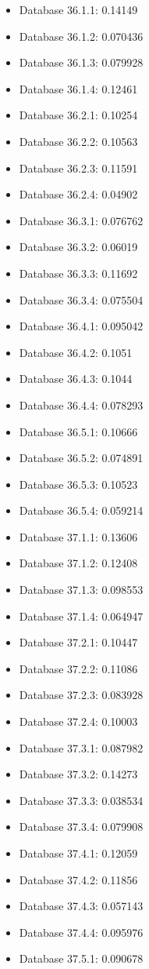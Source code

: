 \begin{itemize}
\item Database 36.1.1: 0.14149
\item Database 36.1.2: 0.070436
\item Database 36.1.3: 0.079928
\item Database 36.1.4: 0.12461
\item Database 36.2.1: 0.10254
\item Database 36.2.2: 0.10563
\item Database 36.2.3: 0.11591
\item Database 36.2.4: 0.04902
\item Database 36.3.1: 0.076762
\item Database 36.3.2: 0.06019
\item Database 36.3.3: 0.11692
\item Database 36.3.4: 0.075504
\item Database 36.4.1: 0.095042
\item Database 36.4.2: 0.1051
\item Database 36.4.3: 0.1044
\item Database 36.4.4: 0.078293
\item Database 36.5.1: 0.10666
\item Database 36.5.2: 0.074891
\item Database 36.5.3: 0.10523
\item Database 36.5.4: 0.059214
\item Database 37.1.1: 0.13606
\item Database 37.1.2: 0.12408
\item Database 37.1.3: 0.098553
\item Database 37.1.4: 0.064947
\item Database 37.2.1: 0.10447
\item Database 37.2.2: 0.11086
\item Database 37.2.3: 0.083928
\item Database 37.2.4: 0.10003
\item Database 37.3.1: 0.087982
\item Database 37.3.2: 0.14273
\item Database 37.3.3: 0.038534
\item Database 37.3.4: 0.079908
\item Database 37.4.1: 0.12059
\item Database 37.4.2: 0.11856
\item Database 37.4.3: 0.057143
\item Database 37.4.4: 0.095976
\item Database 37.5.1: 0.090678

\end{itemize}
